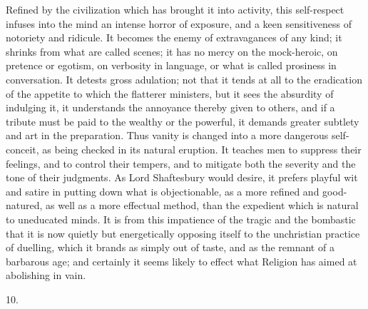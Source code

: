 Refined by the civilization which has brought it into activity,
this self-respect infuses into the mind an intense horror of exposure,
and a keen sensitiveness of notoriety and ridicule. It becomes the
enemy of extravagances of any kind; it shrinks from what are called
scenes; it has no mercy on the mock-heroic, on pretence or egotism, on
verbosity in language, or what is called prosiness in conversation. It
detests gross adulation; not that it tends at all to the eradication
of the appetite to which the flatterer ministers, but it sees the
absurdity of indulging it, it understands the annoyance thereby given
to others, and if a tribute must be paid to the wealthy or the
powerful, it demands greater subtlety and art in the preparation. Thus
vanity is changed into a more dangerous self-conceit, as being checked
in its natural eruption. It teaches men to suppress their feelings,
and to control their tempers, and to mitigate both the severity and
the tone of their judgments. As Lord Shaftesbury would desire, it
prefers playful wit and satire in putting down what is objectionable,
as a more refined and good-natured, as well as a more effectual
method, than the expedient which is natural to uneducated minds. It is
from this impatience of the tragic and the bombastic that it is now
quietly but energetically opposing itself to the unchristian practice
of duelling, which it brands as simply out of taste, and as the
remnant of a barbarous age; and certainly it seems likely to effect
what Religion has aimed at abolishing in vain.

10.

